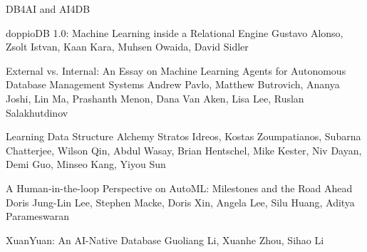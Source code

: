 \documentclass[11pt]{article}
\begin{document}
\begin{bulletin}
\begin{articlesection}{DB4AI and AI4DB}
\begin{article}
{doppioDB 1.0: Machine Learning inside a Relational Engine}
{Gustavo Alonso, Zsolt Istvan, Kaan Kara, Muhsen Owaida, David Sidler}
\graphicspath{{submissions/gustavo/}}

\end{article}


\begin{article}
{External vs. Internal: An Essay on  Machine Learning Agents for  Autonomous Database Management Systems}
{Andrew Pavlo, Matthew Butrovich, Ananya Joshi, Lin Ma, Prashanth 
Menon, Dana Van Aken, Lisa Lee, Ruslan Salakhutdinov}
\graphicspath{{submissions/selfdriving/}}

\end{article}



\begin{article}
{Learning Data Structure Alchemy}
{Stratos Idreos, 
Kostas Zoumpatianos, 
Subarna Chatterjee, 
Wilson Qin,
Abdul Wasay,
Brian Hentschel, 
Mike Kester,
Niv Dayan,
Demi Guo,
Minseo Kang,
Yiyou Sun
}
\graphicspath{{submissions/Learning/}}

\end{article}



\begin{article}
{A Human-in-the-loop Perspective on AutoML: Milestones and the Road Ahead}
{Doris Jung-Lin Lee, Stephen Macke, Doris Xin, Angela Lee, Silu Huang, Aditya Parameswaran}
\graphicspath{{submissions/automl/}}

\end{article}

\begin{article}
{XuanYuan: An AI-Native Database}
{Guoliang Li, Xuanhe Zhou, Sihao Li}
\graphicspath{{submissions/ainative/}}

\end{article}



\end{articlesection}

%
%
%
%
%
%
%



\end{bulletin}
\end{document}
